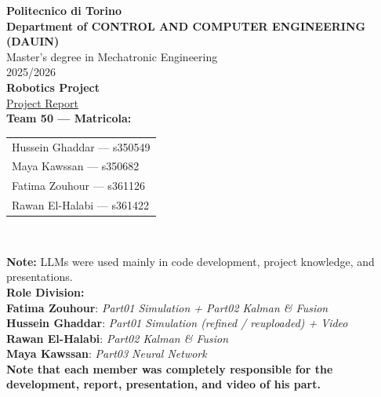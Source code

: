 \documentclass[11pt,a4paper]{article}
\begin{document}
\begin{titlepage}
\centering
\vspace*{1.5cm}
{\color{politoblue}\Large\textbf{Politecnico di Torino}}\\[1.5cm]

{\large\textbf{Department of CONTROL AND COMPUTER ENGINEERING (DAUIN)}}\\[0.6cm]
{\large Master's degree in Mechatronic Engineering}\\[0.2cm]
{\large 2025/2026}\\[1.5cm]

{\Huge\textbf{Robotics Project}}\\[0.6cm]
{\Large\underline{Project Report}}\\[1.5cm]

{\large\textbf{Team 50 --- Matricola:}}\\[0.4cm]
\begin{tabular}{l}
Hussein Ghaddar --- s350549\\
Maya Kawssan --- s350682\\
Fatima Zouhour --- s361126\\
Rawan El-Halabi --- s361422\\
\end{tabular}\\[1.5cm]

\begin{flushleft}
\textbf{Note:} LLMs were used mainly in code development, project knowledge, and
presentations.\\[0.8cm]

\textbf{Role Division:}\\[0.2cm]
\textbf{Fatima Zouhour}: \textit{Part01 Simulation + Part02 Kalman \& Fusion}\\[0.2cm]
\textbf{Hussein Ghaddar}: \textit{Part01 Simulation (refined / reuploaded) + Video}\\[0.2cm]
\textbf{Rawan El-Halabi}: \textit{Part02 Kalman \& Fusion}\\[0.2cm]
\textbf{Maya Kawssan}: \textit{Part03 Neural Network}\\[0.6cm]

\textbf{Note that each member was completely responsible for the development,
report, presentation, and video of his part.}
\end{flushleft}

\vfill
\end{titlepage}
\end{document}
